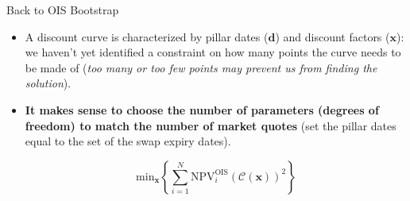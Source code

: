 \documentclass{beamer}
\begin{document}
\begin{frame}{Back to OIS Bootstrap}
	\begin{itemize} 
 \item A discount curve is characterized by pillar dates ($\mathbf{d}$) and discount factors ($\mathbf{x}$):
we haven't yet identified a constraint on how many points the curve needs to be made of (\emph{too many or too few points may prevent us from finding the solution}).
  \item \textbf{It makes sense to choose the number of parameters (degrees of freedom) to match the number of market quotes} (set the pillar dates equal to the set of the swap expiry dates).
 
 \begin{equation}
  \mathrm{min}_{\mathbf{x}} \left\{\sum_{i=1}^{N}\mathrm{NPV}^\mathrm{OIS}_i( \mathcal{C}(\mathbf{x}))^2\right\}
 \end{equation}
\end{itemize}
\end{frame} 
     
\end{document}
